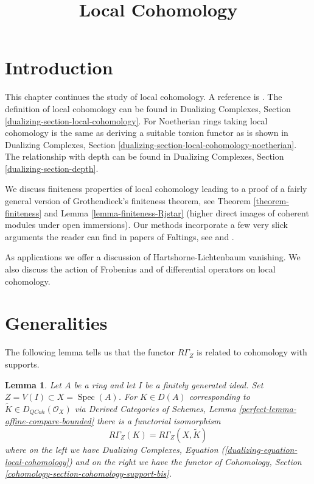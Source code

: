 \documentclass{stacks-project}
\theoremstyle{plain}
\newtheorem{lemma}[subsection]{Lemma}
\theoremstyle{definition}
\theoremstyle{remark}
\numberwithin{equation}{subsection}
\def\Spec{\mathop{\mathrm{Spec}}}
\def\QCoh{\mathit{QCoh}}
\begin{document}
\title{Local Cohomology}


\maketitle

\label{section-phantom}

\tableofcontents

\section{Introduction}
\label{section-introduction}

\noindent
This chapter continues the study of local cohomology.
A reference is \cite{SGA2}.
The definition of local cohomology can be found in
Dualizing Complexes, Section \ref{dualizing-section-local-cohomology}.
For Noetherian rings taking local cohomology is the same
as deriving a suitable torsion functor as is shown in
Dualizing Complexes, Section
\ref{dualizing-section-local-cohomology-noetherian}.
The relationship with depth can be found in
Dualizing Complexes, Section
\ref{dualizing-section-depth}.

\medskip\noindent
We discuss finiteness properties of local cohomology leading to a proof
of a fairly general version of
Grothendieck's finiteness theorem, see Theorem \ref{theorem-finiteness}
and Lemma \ref{lemma-finiteness-Rjstar} (higher direct images
of coherent modules under open immersions).
Our methods incorporate a few very slick arguments the reader
can find in papers of Faltings, see
\cite{Faltings-annulators} and \cite{Faltings-finiteness}.

\medskip\noindent
As applications we offer a discussion of
Hartshorne-Lichtenbaum vanishing. We also discuss
the action of Frobenius and of differential operators
on local cohomology.




\section{Generalities}
\label{section-generalities}

\noindent
The following lemma tells us that the functor $R\Gamma_Z$
is related to cohomology with supports.

\begin{lemma}
\label{lemma-local-cohomology-is-local-cohomology}
Let $A$ be a ring and let $I$ be a finitely generated ideal.
Set $Z = V(I) \subset X = \Spec(A)$. For $K \in D(A)$ corresponding
to $\widetilde{K} \in D_\QCoh(\mathcal{O}_X)$ via
Derived Categories of Schemes, Lemma \ref{perfect-lemma-affine-compare-bounded}
there is a functorial isomorphism
$$
R\Gamma_Z(K) = R\Gamma_Z(X, \widetilde{K})
$$
where on the left we have
Dualizing Complexes, Equation (\ref{dualizing-equation-local-cohomology})
and on the right we have the functor of
Cohomology, Section \ref{cohomology-section-cohomology-support-bis}.
\end{lemma}
\end{document}
